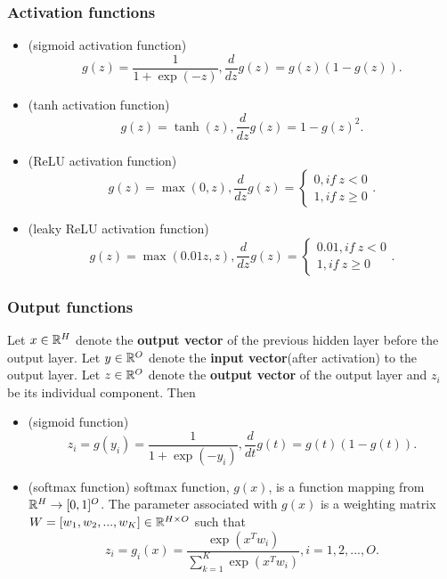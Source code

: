 \begin{refsection}
\begin{definition}
\begin{itemize}
\end{itemize}
\end{definition}

\subsubsection{Activation functions}

\begin{definition}\hfill
\begin{itemize}
	\item (sigmoid activation function)
	$$g(z) = \frac{1}{1 + \exp(-z)}, \frac{d}{dz}g(z) = g(z)(1 - g(z)).$$
	\item (tanh activation function)
	$$g(z) = \tanh(z), \frac{d}{dz}g(z) = 1 - g(z)^2.$$
	\item (ReLU activation function)
	$$g(z) = \max(0,z), \frac{d}{dz}g(z) =\begin{cases*}
	0, if~ z < 0\\
	1, if~ z\geq 0
	\end{cases*}.$$
	\item (leaky ReLU activation function)
	$$g(z) = \max(0.01z,z), \frac{d}{dz}g(z) =\begin{cases*}
	0.01, if~ z < 0\\
	1, if~ z\geq 0
	\end{cases*}.$$
	
\end{itemize}	
	
\end{definition}

\subsubsection{Output functions}

\begin{definition}\hfill
Let $x\in \mathbb{R}^H$ denote the \textbf{output vector} of the previous hidden layer before the output layer.	
Let $y\in\mathbb{R}^O$ denote the \textbf{input vector}(after activation) to the output layer. Let $z\in \mathbb{R}^O$ denote the \textbf{output vector} of the output layer and $z_i$ be its individual component. Then 	
	\begin{itemize}
		\item (sigmoid  function) 
		$$z_i  = g(y_i) = \frac{1}{1 + \exp(-y_i)}, \frac{d}{dt}g(t) = g(t)(1 - g(t)).$$
		\item (softmax function) softmax function, $g(x)$, is a function mapping from $\mathbb{R}^H \to [0,1]^O$. The parameter associated with $g(x)$ is a weighting matrix $W = [w_1,w_2,...,w_K]\in \mathbb{R}^{H\times O}$ such that
		$$z_i = g_i(x) = \frac{\exp(x^Tw_i)}{\sum_{k=1}^{K}\exp(x^Tw_i)},i=1,2,...,O.$$
		

\end{itemize}
\end{definition}
\end{refsection}
